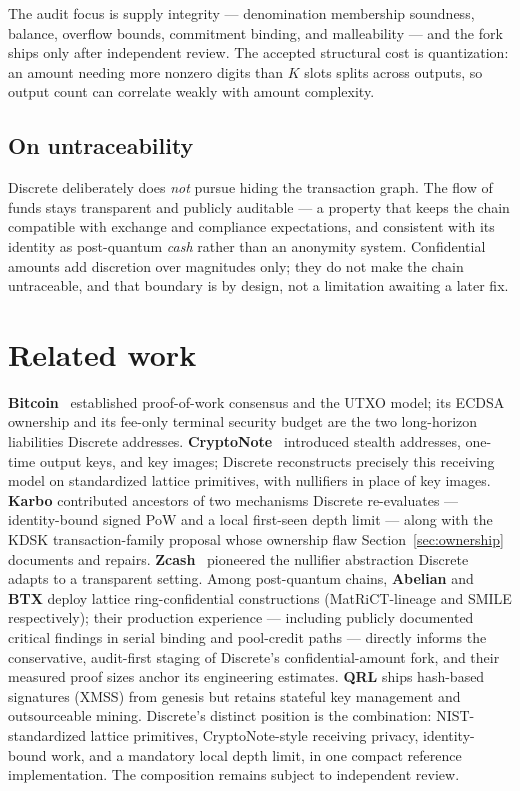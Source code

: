 \documentclass[11pt,a4paper]{article}
\begin{document}
The audit focus is supply integrity --- denomination membership soundness,
balance, overflow bounds, commitment binding, and malleability --- and the
fork ships only after independent review. The accepted structural cost is
quantization: an amount needing more nonzero digits than $K$ slots splits
across outputs, so output count can correlate weakly with amount complexity.

\subsection{On untraceability}

Discrete deliberately does \emph{not} pursue hiding the transaction graph.
The flow of funds stays transparent and publicly auditable --- a property that
keeps the chain compatible with exchange and compliance expectations, and
consistent with its identity as post-quantum \emph{cash} rather than an
anonymity system. Confidential amounts add discretion over magnitudes only;
they do not make the chain untraceable, and that boundary is by design, not a
limitation awaiting a later fix.

\section{Related work}\label{sec:related}

\textbf{Bitcoin}~\cite{bitcoin} established proof-of-work consensus and the
UTXO model; its ECDSA ownership and its fee-only terminal security budget are
the two long-horizon liabilities Discrete addresses.
\textbf{CryptoNote}~\cite{cryptonote} introduced stealth addresses, one-time
output keys, and key images; Discrete reconstructs precisely this receiving
model on standardized lattice primitives, with nullifiers in place of key
images. \textbf{Karbo} contributed ancestors of two mechanisms Discrete
re-evaluates --- identity-bound signed PoW and a local first-seen depth limit ---
along with the KDSK
transaction-family proposal whose ownership flaw
Section~\ref{sec:ownership} documents and repairs.
\textbf{Zcash}~\cite{zerocash} pioneered the nullifier abstraction Discrete
adapts to a transparent setting. Among post-quantum chains,
\textbf{Abelian} and \textbf{BTX} deploy lattice ring-confidential
constructions (MatRiCT-lineage and SMILE respectively); their production
experience --- including publicly documented critical findings in serial
binding and pool-credit paths --- directly informs the conservative,
audit-first staging of Discrete's confidential-amount fork, and their
measured proof sizes anchor its engineering estimates. \textbf{QRL} ships
hash-based signatures (XMSS) from genesis but retains stateful key
management and outsourceable mining. Discrete's distinct position is the
combination: NIST-standardized lattice primitives, CryptoNote-style receiving
privacy, identity-bound work, and a mandatory local depth limit, in one
compact reference implementation. The composition remains subject to
independent review.
\end{document}
